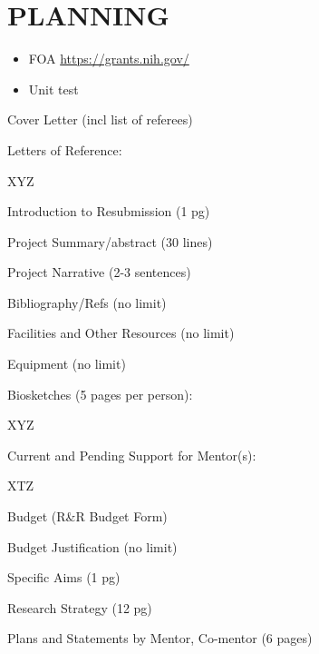 \documentclass[11pt]{article}
\newcommand{\done}{\rlap{$\square$}{\raisebox{2pt}{\large\hspace{1pt}$\checkmark$}}}
\newcommand{\inprogress}{\rlap{$\square$}{\Large\hspace{2pt}$\cdot$}}
\begin{document}

\section*{PLANNING}

\begin{itemize}
  \item FOA \url{https://grants.nih.gov/}
  \item Unit test \autocite{HuEtAl2023,MooreEtAl2024,RamakrishnanEtAl2015,MaxianEtAl2021a,WinterEtAl2024,WurthnerEtAl2022,PedersenEtAl2024}
\end{itemize}

\vspace{2cm}

\begin{todolist}
  \item[\done] Cover Letter (incl list of referees)
  \item[\done] Letters of Reference:
  \begin{todolist}
    \item[\done] XYZ
  \end{todolist}
  \item[\inprogress] Introduction to Resubmission (1 pg)
  \item Project Summary/abstract (30 lines)
  \item Project Narrative (2-3 sentences)
  \item Bibliography/Refs (no limit)
  \item Facilities and Other Resources (no limit)
  \item Equipment (no limit)
  \item Biosketches (5 pages per person):
  \begin{todolist}
    \item XYZ
  \end{todolist}
  \item Current and Pending Support for Mentor(s):
  \begin{todolist}
    \item XTZ
  \end{todolist}
  \item Budget (R\&R Budget Form)
  \item Budget Justification (no limit)
  \item Specific Aims (1 pg)
  \item Research Strategy (12 pg)
  \item Plans and Statements by Mentor, Co-mentor (6 pages)

\end{todolist}
\end{document}
